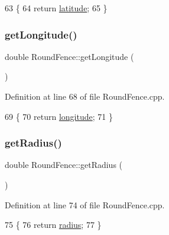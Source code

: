\begin{DoxyCode}
63 \{
64     \textcolor{keywordflow}{return} \hyperlink{class_round_fence_ad48cb4c95dab320652679bae203b7caf}{latitude};
65 \}
\end{DoxyCode}
\mbox{\label{class_round_fence_a301944908bde9659847bf5048633ae9d}} 
\subsubsection{\texorpdfstring{get\+Longitude()}{getLongitude()}}
{\footnotesize\ttfamily double Round\+Fence\+::get\+Longitude (\begin{DoxyParamCaption}{ }\end{DoxyParamCaption})}



Definition at line 68 of file Round\+Fence.\+cpp.


\begin{DoxyCode}
69 \{
70     \textcolor{keywordflow}{return} \hyperlink{class_round_fence_a122cccc61f294c1fcdf7ebe944944fca}{longitude};
71 \}
\end{DoxyCode}
\mbox{\label{class_round_fence_a9a7eba297334bf868fd552654df1ad3c}} 
\subsubsection{\texorpdfstring{get\+Radius()}{getRadius()}}
{\footnotesize\ttfamily double Round\+Fence\+::get\+Radius (\begin{DoxyParamCaption}{ }\end{DoxyParamCaption})}



Definition at line 74 of file Round\+Fence.\+cpp.


\begin{DoxyCode}
75 \{
76     \textcolor{keywordflow}{return} \hyperlink{class_round_fence_a8e9d1a2f22df0bb718522f3ab6cd3b83}{radius};
77 \}
\end{DoxyCode}
\mbox{\label{class_round_fence_a4955bf0dbd168853ba9913465953865d}} 
